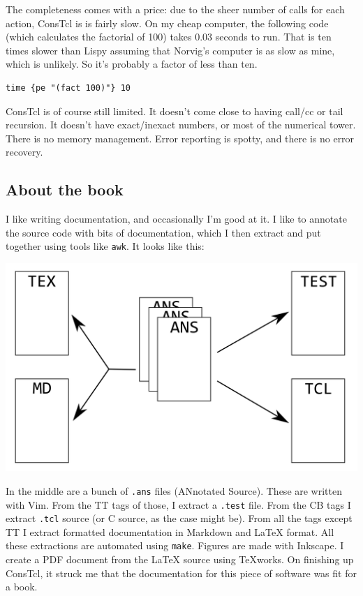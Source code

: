 \documentclass[twoside,9pt]{report}
\begin{document}
The completeness comes with a price: due to the sheer number of calls for each
action, ConsTcl is is fairly slow. On my cheap computer, the following code
(which calculates the factorial of 100) takes 0.03 seconds to run. That is ten
times slower than Lispy assuming that Norvig's computer is as slow as mine,
which is unlikely. So it's probably a factor of less than ten.

\begin{verbatim}
time {pe "(fact 100)"} 10
\end{verbatim}

ConsTcl is of course still limited. It doesn't come close to having call/cc or
tail recursion. It doesn't have exact/inexact numbers, or most of the numerical
tower. There is no memory management. Error reporting is spotty, and there is no
error recovery.

\subsection{About the book}
\label{about-the-book}


I like writing documentation, and occasionally I'm good at it. I like to
annotate the source code with bits of documentation, which I then extract and
put together using tools like \texttt{awk}. It looks like this:

\includegraphics{images/document.png}

In the middle are a bunch of \texttt{.ans} files (ANnotated Source). These are
written with Vim. From the TT tags of those, I extract a \texttt{.test} file.
From the CB tags I extract \texttt{.tcl} source (or C source, as the case might
be). From all the tags except TT I extract formatted documentation in Markdown
and \LaTeX{} format. All these extractions are automated using \texttt{make}.
Figures are made with Inkscape.  I create a PDF document from the \LaTeX{}
source using TeXworks. On finishing up ConsTcl, it struck me that the
documentation for this piece of software was fit for a book.
\end{document}
